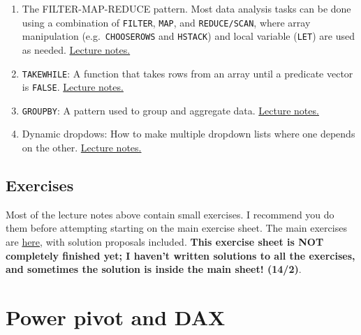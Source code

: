 \documentclass[
  letterpaper,
  DIV=11,
  numbers=noendperiod]{scrreprt}
\providecommand{\tightlist}{%
  \setlength{\itemsep}{0pt}\setlength{\parskip}{0pt}}\usepackage{longtable,booktabs,array}
\begin{document}
\begin{enumerate}
\def\labelenumi{\arabic{enumi}.}
\tightlist
\item
  The FILTER-MAP-REDUCE pattern. Most data analysis tasks can be done
  using a combination of \texttt{FILTER}, \texttt{MAP}, and
  \texttt{REDUCE/SCAN}, where array manipulation
  (e.g.~\texttt{CHOOSEROWS} and \texttt{HSTACK}) and local variable
  (\texttt{LET}) are used as needed.
  \href{https://github.com/BI-DS/ELE-3915/blob/main/slides/lecture06/04_map-filter-reduce.xlsx}{Lecture
  notes.}
\item
  \texttt{TAKEWHILE}: A function that takes rows from an array until a
  predicate vector is \texttt{FALSE}.
  \href{https://github.com/BI-DS/ELE-3915/blob/main/slides/lecture06/06_application_1_takewhile.xlsx}{Lecture
  notes.}
\item
  \texttt{GROUPBY}: A pattern used to group and aggregate data.
  \href{https://github.com/BI-DS/ELE-3915/blob/main/slides/lecture06/07_application_2_groupby.xlsx}{Lecture
  notes.}
\item
  Dynamic dropdows: How to make multiple dropdown lists where one
  depends on the other.
  \href{https://github.com/BI-DS/ELE-3915/blob/main/slides/lecture06/08_application_3_dynamic_dropdowns.xlsx}{Lecture
  notes.}
\end{enumerate}

\hypertarget{exercises}{%
\section{Exercises}\label{exercises}}

Most of the lecture notes above contain small exercises. I recommend you
do them before attempting starting on the main exercise sheet. The main
exercises are
\href{https://github.com/BI-DS/ELE-3915/blob/main/exercises/exercises06.xlsx}{here},
with solution proposals included. \textbf{This exercise sheet is NOT
completely finished yet; I haven't written solutions to all the
exercises, and sometimes the solution is inside the main sheet! (14/2)}.


\hypertarget{power-pivot-and-dax}{%
\chapter{Power pivot and DAX}\label{power-pivot-and-dax}}
\end{document}
